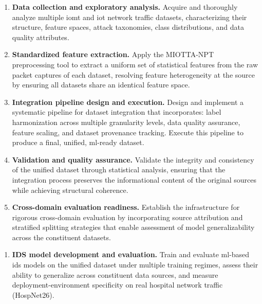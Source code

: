 \begin{enumerate}[leftmargin=*, label=\textbf{O\arabic*.}]
    \item \textbf{Data collection and exploratory analysis.} Acquire and thoroughly analyze multiple \gls{iomt} and \gls{iot} network traffic datasets, characterizing their structure, feature spaces, attack taxonomies, class distributions, and data quality attributes.

    \item \textbf{Standardized feature extraction.} Apply the MIOTTA-NPT~\cite{leon2025miotta} preprocessing tool to extract a uniform set of statistical features from the raw packet captures of each dataset, resolving feature heterogeneity at the source by ensuring all datasets share an identical feature space.

    \item \textbf{Integration pipeline design and execution.} Design and implement a systematic pipeline for dataset integration that incorporates: label harmonization across multiple granularity levels, data quality assurance, feature scaling, and dataset provenance tracking. Execute this pipeline to produce a final, unified, \gls{ml}-ready dataset.

    \item \textbf{Validation and quality assurance.} Validate the integrity and consistency of the unified dataset through statistical analysis, ensuring that the integration process preserves the informational content of the original sources while achieving structural coherence.

    \item \textbf{Cross-domain evaluation readiness.} Establish the infrastructure for rigorous cross-domain evaluation by incorporating source attribution and stratified splitting strategies that enable assessment of model generalizability across the constituent datasets.
\end{enumerate}

\begin{enumerate}[leftmargin=*, label=\textbf{O\arabic*.}, start=6]
    \item \textbf{IDS model development and evaluation.} Train and evaluate \gls{ml}-based \gls{ids} models on the unified dataset under multiple training regimes, assess their ability to generalize across constituent data sources, and measure deployment-environment specificity on real hospital network traffic (HospNet26).
\end{enumerate}

